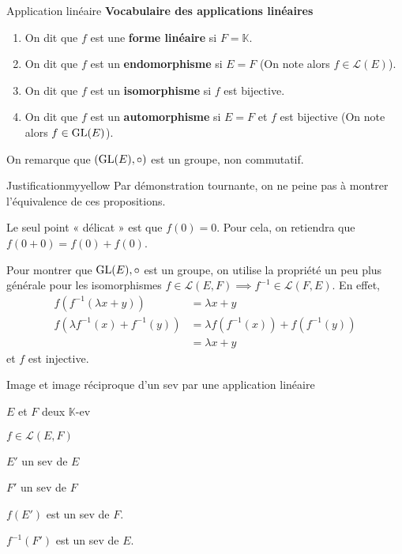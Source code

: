 \begin{defi}{Application linéaire}{}
        \textbf{Vocabulaire des applications linéaires}
        \begin{enumerate}[label=\textcolor{myyellow}{(\arabic*)}]
            \item On dit que $f$ est une \textbf{forme linéaire} si $F = \mathbb{K}$.
            \item On dit que $f$ est un \textbf{endomorphisme} si $E = F$ (On note alors $f \in \mathcal{L}(E)$).
            \item On dit que $f$ est un \textbf{isomorphisme} si $f$ est bijective. 
            \item On dit que $f$ est un \textbf{automorphisme} si $E = F$ et $f$ est bijective (On note alors $f \in \operatorname{GL}(E)$).
        \end{enumerate}
        On remarque que $(\operatorname{GL}(E),\circ)$ est un groupe, non commutatif.
    \end{defi}

    \begin{demo}{Justification}{myyellow}
        Par démonstration tournante, on ne peine pas à montrer l’équivalence de ces propositions.

        Le seul point « délicat » est que $f(0) = 0$. Pour cela, on retiendra que $f(0 + 0) = f(0) + f(0)$.

        Pour montrer que $\operatorname{GL}(E),\circ$ est un groupe, on utilise la propriété un peu plus générale pour les isomorphismes $f \in \mathcal{L}(E,F) \implies f^{-1} \in \mathcal{L}(F,E)$. En effet, 
        \begin{align*}
            f \left(f^{-1} (\lambda x + y)\right) &= \lambda x + y \\
            f \left(\lambda f^{-1}(x) + f^{-1}(y)\right) &= \lambda f(f^{-1}(x)) + f (f^{-1}(y)) \\
             & = \lambda x + y 
        \end{align*}
        et $f$ est injective.
    \end{demo}

    \begin{prop}{Image et image réciproque d’un sev par une application linéaire}{}
        \begin{soient}
            \item $E$ et $F$ deux $\mathbb{K}$-ev
            \item $f \in \mathcal{L}(E,F)$
            \item $E'$ un sev de $E$
            \item $F'$ un sev de $F$
        \end{soient}
        \begin{alors}
            \item $f(E')$ est un sev de $F$.
            \item $f^{-1}(F')$ est un sev de $E$.
        \end{alors}
    \end{prop}
    

